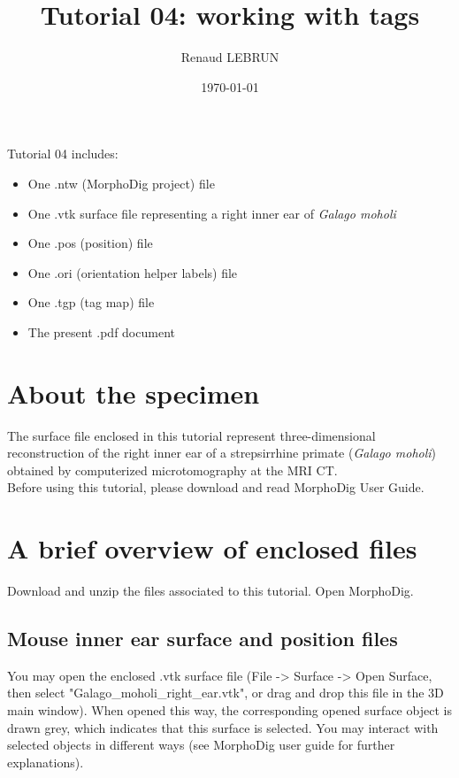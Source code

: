 \documentclass[12pt, a4paper]{book}
\title{Tutorial 04: working with tags}
\author{Renaud LEBRUN}
\affil{Institut des Sciences de l'Evolution, Université de Montpellier, France}
\date{\today}
\begin{document}
\dominitoc	

\maketitle

\faketableofcontents



\minitoc 
Tutorial 04 includes:
\begin{itemize}
\item One .ntw (MorphoDig project) file
\item One .vtk surface file representing a right inner ear of \textit{Galago moholi}
\item One .pos (position) file 
\item One .ori (orientation helper labels) file 
\item One .tgp (tag map) file
\item The present .pdf document
\end{itemize}





\section{About the specimen}

The surface file enclosed in this tutorial represent three-dimensional reconstruction of the right inner ear of a strepsirrhine primate (\textit{Galago moholi}) obtained by computerized microtomography at the MRI \si{\micro} CT.\\
Before using this tutorial, please download and read MorphoDig User Guide.


\section{A brief overview of enclosed files}
		Download and unzip the files associated to this tutorial. Open MorphoDig.
\subsection{Mouse inner ear surface and position files}
	You may open the enclosed .vtk surface file (File -> Surface -> Open Surface, then select "Galago\_moholi\_right\_ear.vtk", or drag and drop this file in the 3D main window). When opened
this way, the corresponding opened surface object is drawn grey, which indicates that this surface
is selected. You may interact with selected objects in different ways (see MorphoDig user guide for
further explanations).\\
\end{document}

